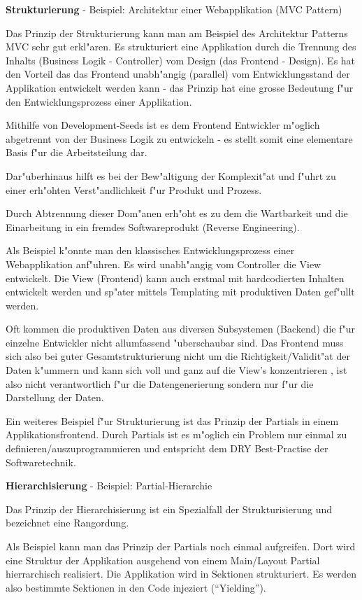 \textbf{Strukturierung}
- Beispiel: Architektur einer Webapplikation (MVC Pattern)

Das Prinzip der Strukturierung kann man am Beispiel des Architektur Patterns MVC sehr gut erkl"aren.
Es strukturiert eine Applikation durch die Trennung des Inhalts (Business Logik - Controller) vom Design (das Frontend - Design).
Es hat den Vorteil das das Frontend unabh"angig (parallel) vom Entwicklungsstand der Applikation entwickelt werden kann - das Prinzip hat eine grosse Bedeutung f"ur den Entwicklungsprozess einer Applikation.

Mithilfe von Development-Seeds ist es dem Frontend Entwickler m"oglich abgetrennt von der Business Logik zu entwickeln - es stellt somit eine elementare Basis f"ur die Arbeitsteilung dar.

Dar"uberhinaus hilft es bei der Bew"altigung der Komplexit"at und f"uhrt zu einer erh"ohten Verst"andlichkeit f"ur Produkt und Prozess.

Durch Abtrennung dieser Dom"anen erh"oht es zu dem die Wartbarkeit und die Einarbeitung in ein fremdes Softwareprodukt (Reverse Engineering).

Als Beispiel k"onnte man den klassisches Entwicklungsprozess einer Webapplikation anf"uhren. Es wird unabh"angig vom Controller die View entwickelt.
Die View (Frontend) kann auch erstmal mit hardcodierten Inhalten entwickelt werden und sp"ater mittels Templating mit produktiven Daten gef"ullt werden.

Oft kommen die produktiven Daten aus diversen Subsystemen (Backend) die f"ur einzelne Entwickler nicht allumfassend "uberschaubar sind.
Das Frontend muss sich also bei guter Gesamtstrukturierung nicht um die Richtigkeit/Validit"at der Daten k"ummern und kann sich voll und ganz auf die View's konzentrieren , ist also nicht verantwortlich f"ur die Datengenerierung sondern nur f"ur die Darstellung der Daten.

Ein weiteres Beispiel f"ur Strukturierung ist das Prinzip der Partials in einem Applikationsfrontend. Durch Partials ist es m"oglich ein Problem nur einmal zu definieren/auszuprogrammieren und entspricht dem DRY Best-Practise der Softwaretechnik.

\textbf{Hierarchisierung}
- Beispiel: Partial-Hierarchie

Das Prinzip der Hierarchisierung ist ein Spezialfall der Strukturisierung und bezeichnet eine Rangordung.

Als Beispiel kann man das Prinzip der Partials noch einmal aufgreifen. Dort wird eine Struktur der Applikation ausgehend von einem Main/Layout Partial hierrarchisch realisiert.
Die Applikation wird in Sektionen strukturiert. Es werden also bestimmte Sektionen in den Code injeziert (``Yielding'').

